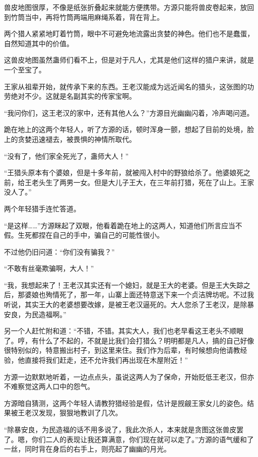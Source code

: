 
\begin{this_body}

兽皮地图很厚，不像是纸张折叠起来就能方便携带。方源只能将兽皮卷起来，放回到竹筒当中，再将竹筒两端用麻绳系着，背在背上。

两个猎人紧紧地盯着竹筒，眼中不可避免地流露出贪婪的神色。他们也不是蠢蛋，自然知道其中的价值。

这兽皮地图虽然蛊师们看不上，但是对于凡人，尤其是他们这样的猎户来讲，就是一个至宝了。

王家从祖辈开始，就传承下来的东西。王老汉能成为远近闻名的猎头，这张图的功劳绝对不少。这就是名副其实的传家宝啊。

“我问你们，这王老汉的家中，还有其他人么？”方源目光幽幽闪着，冷声喝问道。

跪在地上的这两个年轻人，听了方源的话，顿时浑身一颤，想起了目前的处境，脸上的贪婪迅速褪去，被畏惧的神情所取代。

“没有了，他们家全死光了，蛊师大人！”

“王猎头原本有个婆娘，但是十多年前，就被闯入村中的野狼给杀了。他婆娘死之前，给王老头生了两男一女。但是大儿子王大，在三年前打猎，死在了山上。王家没人了。”

两个年轻猎手连忙答道。

“是这样……”方源眯起了双眼，他看着跪在地上的这两人，知道他们所言应当不假。生死都捏在自己的手中，骗自己的可能性很小。

不过他仍旧问道：“你们没有骗我？”

“不敢有丝毫欺骗啊，大人！”

“我，我想起来了！王老汉其实还有一个媳妇，就是王大的老婆。但是王大失踪之后，那婆娘也殉情死了，那一年，山寨上面还特意送下来一个贞洁牌坊呢。不过我听说，其实王大的老婆想要改嫁，是被王老汉逼死的。大人您杀了王老汉，是除暴安良，为民造福啊。”

另一个人赶忙附和道：“不错，不错。其实大人，我们也老早看这王老头不顺眼了。哼，有什么了不起的，不就是比我们会打猎么？明明都是凡人，搞的自己好像很特别似的，特意搬出村子，到这里来住。我们作为后辈，有时候想向他请教经验，他直接将我们赶走，还不允许我们再出现在木屋附近！”

方源一边默默地听着，一边点点头，虽说这两人为了保命，开始贬低王老汉，但亦不难察觉这两人口中的怨气。

方源暗自猜测，这两个年轻人请教狩猎经验是假，估计是觊觎王家女儿的姿色。结果被王老汉发现，狠狠地教训了几次。

“除暴安良，为民造福的话不用多说了，我此次杀人，本来就是贪图这张兽皮罢了。嗯，你们二人的表现让我还算满意，你们现在就可以走了。”方源的语气缓和了一丝，同时背在身后的右手上，则亮起了幽幽的月光。


\end{this_body}
